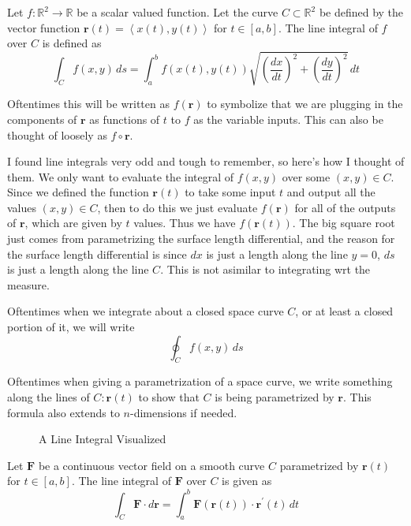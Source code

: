\begin{definition}
    Let \(f:\mathbb{R}^{2}\to \mathbb{R} \) be a scalar valued function. Let the curve \(C \subset \mathbb{R}^2\) be defined by the vector function \(\mathbf{r}(t)= \left\langle x(t),y(t) \right\rangle \) for \(t\in[a,b]\). The line integral of \(f\) over \(C\) is defined as  
    \[
        \int_C f(x,y)\,ds = \int_a^b f(x(t),y(t))\sqrt{\left( \frac{d x}{d t} \right)^2 + \left( \frac{d y}{d t} \right)^2  } \,dt
    \]
\end{definition}
Oftentimes this will be written as \(f(\mathbf{r})\) to symbolize that we are plugging in the components of \(\mathbf{r}\) as functions of \(t\) to \(f\) as the variable inputs. This can also be thought of loosely as \(f\circ \mathbf{r}\).
\begin{intuition}
    I found line integrals very odd and tough to remember, so here's how I thought of them. We only want to evaluate the integral of \(f(x,y)\) over some \((x,y)\in C\). Since we defined the function \(\mathbf{r}(t)\) to take some input \(t\) and output all the values \((x,y)\in C\), then to do this we just evaluate \(f(\mathbf{r})\) for all of the outputs of \(\mathbf{r}\), which are given by \(t\) values. Thus we have \(f(\mathbf{r}(t))\). The big square root just comes from parametrizing the surface length differential, and the reason for the surface length differential is since \(dx\) is just a length along the line \(y=0\), \(ds\) is just a length along the line \(C\). This is not asimilar to integrating wrt the measure.
\begin{remark}
    Oftentimes when we integrate about a closed space curve \(C\), or at least a closed portion of it, we will write
    \[
        \oint_C f(x,y)\,ds
    \]
\end{remark}
Oftentimes when giving a parametrization of a space curve, we write something along the lines of \(C:\mathbf{r}(t)\) to show that \(C\) is being parametrized by \(\mathbf{r}\). This formula also extends to \(n\)-dimensions if needed.
\begin{figure}[ht]
   \centering
   \caption{A Line Integral Visualized}
\end{figure}
\begin{definition}
    Let \(\mathbf{F}\) be a continuous vector field on a smooth curve \(C\) parametrized by \(\mathbf{r}(t)\) for \(t\in[a,b]\). The line integral of \(\mathbf{F}\) over \(C\) is given as 
    \[
        \int_C \mathbf{F}\cdot d \mathbf{r} = \int_a^{b} \mathbf{F}(\mathbf{r}(t)) \cdot \mathbf{r}^{\prime} (t)\,dt
    \]
\end{definition}

\end{intuition}
